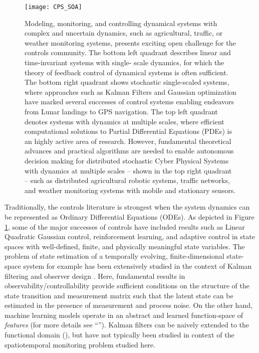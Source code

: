 \begin{figure}[h] %
	\centering
	\texttt{[image: CPS\_SOA]}
		\caption{Modeling, monitoring, and controlling dynamical systems with complex and uncertain dynamics, such as agricultural, traffic, or weather monitoring systems, presents exciting open challenge for the controls community. The bottom left quadrant describes linear and time-invariant systems with single- scale dynamics, for which the theory of feedback control of dynamical systems is often sufficient. The bottom right quadrant shows stochastic single-scaled systems, where approaches such as Kalman Filters and Gaussian optimization have marked several successes of control systems enabling endeavors from Lunar landings to GPS navigation. The top left quadrant denotes systems with dynamics at multiple scales, where efficient computational solutions to Partial Differential Equations (PDEs) is an highly active area of research. However, fundamental theoretical advances and practical algorithms are needed to enable autonomous decision making for distributed stochastic Cyber Physical Systems with dynamics at multiple scales – shown in the top right quadrant – such as distributed agricultural robotic systems, traffic networks, and weather monitoring systems with mobile and stationary sensors.}
	\label{fig:cps_soa}
\end{figure}
  
Traditionally, the controls literature is strongest when the system dynamics can be represented as Ordinary Differential Equations (ODEs). %
As depicted in Figure \ref{fig:cps_soa}, some of the major successes of controls have included results such as Linear Quadratic Gaussian control, reinforcement learning, and adaptive control in state spaces with well-defined, finite, and physically meaningful state variables. The problem of state estimation of a temporally evolving, finite-dimensional state-space system for example has been extensively studied in the context of Kalman filtering and observer design \cite{Gelb74}. Here, fundamental results in observability/controllability provide sufficient conditions on the structure of the state transition and measurement matrix such that the latent state can be estimated in the presence of measurement and process noise. %
On the other hand, machine learning models operate in an abstract and learned function-space of \textit{features} (for more details see ``''). Kalman filters can be naively extended to the functional domain (\cite{mardia1998kriged}), but have not typically been studied in context of the spatiotemporal monitoring problem studied here.  


